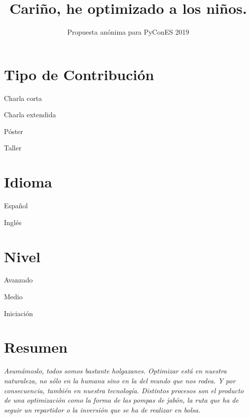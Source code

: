 \documentclass[runningheads]{llncs}
\newcommand{\cmark}{\ding{51}}%
\newcommand{\done}{\rlap{$\square$}{\raisebox{2pt}{\large\hspace{1pt}\cmark}}%
\hspace{-2.5pt}}
\begin{document}
\pagestyle{headings}
\mainmatter


\title{Cariño, he optimizado a los niños.} %


\author{Propuesta an\'onima para PyConES 2019}

\maketitle

\section{Tipo de Contribuci\'on}

\begin{todolist}
  \item Charla corta
  \item [\done]Charla extendida
  \item P\'oster
  \item Taller
  \end{todolist}


\section{Idioma}
\begin{todolist}
  \item [\done]Espa\~nol
  \item Ingl\'es
\end{todolist}
\section{Nivel}

\begin{todolist}
  \item Avanzado
  \item [\done] Medio
  \item Iniciaci\'on
  \end{todolist}


\newpage

\section{Resumen}
\textit{Asumámoslo, todos somos bastante holgazanes. Optimizar está en nuestra naturaleza, no sólo en la humana sino en la del mundo que nos rodea. Y por consecuencia, también en nuestra tecnología. Distintos procesos son el producto de una optimización como la forma de las pompas de jabón, la ruta que ha de seguir un repartidor o la inversión que se ha de realizar en bolsa. }
	
\end{document}
